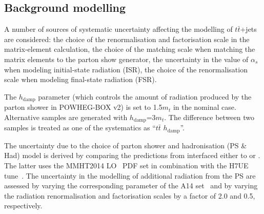 \documentclass[PAPER, coverpage, atlasdraft=true, texlive=2016, UKenglish]{\ATLASLATEXPATH atlasdoc} %
\begin{document}
\subsection{Background modelling}
\label{sec:syst_bkgmodeling}

A number of sources of systematic uncertainty affecting the modelling of $t\bar{t}$+jets are considered: the choice of the renormalisation and factorisation scale in the matrix-element calculation, the choice of the matching scale when matching the matrix elements to the parton show generator, the uncertainty in the value of $\alpha_s$ when modeling initial-state radiation (ISR), the choice of the renormalisation scale when modeling final-state radiation (FSR).

The $h_{\mathrm{damp}}$ parameter (which controls the amount of radiation produced by the parton shower in
POWHEG-BOX v2) is set to 1.5$m_t$ in the nominal case. Alternative samples are generated with $h_{\mathrm{damp}}$=3$m_t$. The
difference between two samples is treated as one of the systematics as ``$t\bar{t}$ $h_{\mathrm{damp}}$''. 

The uncertainty due to the choice of parton shower and hadronisation (PS \& Had) model is derived 
by comparing the predictions from {\powheg} interfaced either to {\pythiaeight} or {}.
The latter uses the MMHT2014 LO~\cite{Harland-Lang:2014zoa} PDF set in combination with the H7UE tune~\cite{Bellm:2015jjp}.
The uncertainty in the modelling of additional radiation from the PS are assessed by
varying the corresponding parameter of the A14 set~\cite{ATL-PHYS-PUB-2016-004} and by varying the radiation renormalisation and factorisation scales
by a factor of 2.0 and 0.5, respectively. 
\end{document}
